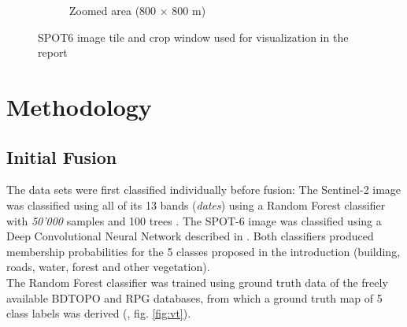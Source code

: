 \documentclass[10pt]{article}
\begin{document}
\begin{figure}[H]
\begin{subfigure}{0.49\textwidth}
        \caption{Zoomed area (800 $\times$ 800 m)}
        \label{fig:areaSmall}
    \end{subfigure}
    \caption{SPOT6 image tile and crop window used for visualization in the report}
    \label{fig:area}
    \centering
\end{figure}

\section{Methodology}\label{sec:method}
\subsection{Initial Fusion}

The data sets were first classified individually before fusion: The Sentinel-2 image was classified using all of its 13 bands (\textit{dates}) using a Random Forest classifier with \textit{50'000} samples and 100 trees \parencite{Breiman2001}. The SPOT-6 image was classified using a Deep Convolutional Neural Network described in \cite{postadjian_investigating_2017}. Both classifiers produced membership probabilities for the 5 classes proposed in the introduction (building, roads, water, forest and other vegetation).\\

The Random Forest classifier was trained using ground truth data of the freely available BDTOPO and RPG databases, from which a ground truth map of 5 class labels was derived (\cite{bdtopo,RPG}, fig. \ref{fig:vt}).
\end{document}
